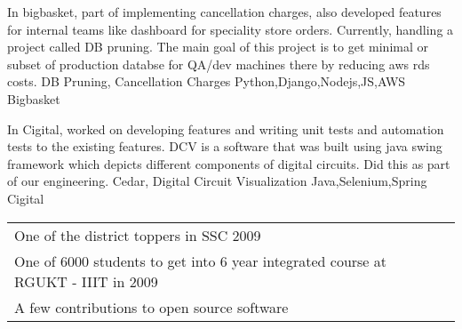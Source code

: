 \documentclass[]{awesome-cv}
\begin{document}
\vspace{-10mm}
\begin{cventries}
	\cventry
	{In bigbasket, part of implementing cancellation charges, also developed features for internal teams like dashboard for speciality store orders. Currently, handling a project called DB pruning. The main goal of this project is to get minimal or subset of production databse for QA/dev machines there by reducing aws rds costs.}
	{DB Pruning, Cancellation Charges}
	{Python,Django,Nodejs,JS,AWS}
	{Bigbasket}
	{}
	
	\vspace{-5mm}
\end{cventries}
\begin{cventries}
	\cventry
	{In Cigital, worked on developing features and writing unit tests and automation tests to the existing features. DCV is a software that was built using java swing framework which depicts different components of digital circuits. Did this as part of our engineering.}
	{Cedar, Digital Circuit Visualization}
	{Java,Selenium,Spring}
	{Cigital}
	{}
	
	\vspace{-5mm}
\end{cventries}
\begin{cventries}
	\cventry
	{}
	{
	{\def\arraystretch{1.15}{\begin{tabular}{ l l }
		One of the district toppers in SSC 2009 \\
		One of 6000 students to get into 6 year integrated course at RGUKT - IIIT in 2009 \\
		A few contributions to open source software\\
		\end{tabular}}}}
	{}
	{}
	{}
	
	\vspace{-5mm}
\end{cventries}
 
\end{document}
